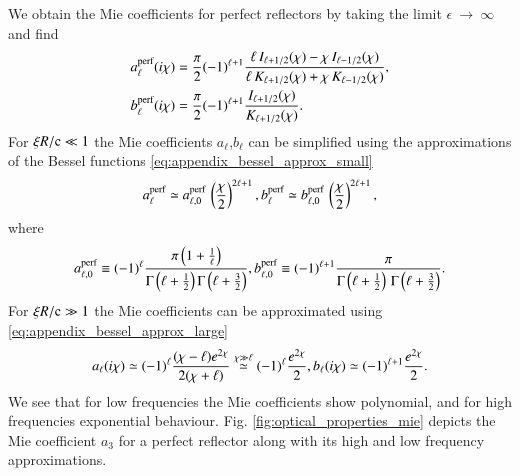 We obtain the Mie coefficients for perfect reflectors by taking the limit
$\epsilon~\to~\infty$ and find
\begin{align}
a_\ell^\text{perf}(i\chi) &= \frac{\pi}{2} (-1)^{\ell+1} \frac{ \ell\,I_{\ell+1/2}(\chi) - \chi\,I_{\ell-1/2}(\chi) }{ \ell\,K_{\ell+1/2}(\chi) + \chi\,K_{\ell-1/2}(\chi) }, \\
b_\ell^\text{perf}(i\chi) &= \frac{\pi}{2} (-1)^{\ell+1} \frac{ I_{\ell+1/2}(\chi)}{ K_{\ell+1/2}(\chi) }.
\end{align}
For $\xi R/\mathrm{c} \ll 1$ the Mie coefficients $a_\ell$,$b_\ell$ can be simplified
using the approximations of the Bessel functions \eqref{eq:appendix_bessel_approx_small}
\begin{equation}
\label{eq:scattering_ps_mie_approx}
a_\ell^\text{perf} \simeq a_{\ell,0}^\text{perf} \, \left(\frac{\chi}{2}\right)^{2\ell+1}, \\
b_\ell^\text{perf} \simeq b_{\ell,0}^\text{perf} \, \left(\frac{\chi}{2}\right)^{2\ell+1},
\end{equation}
where
\begin{equation}
\label{eq:scattering_ps_mie_prefactors}
a_{\ell,0}^\text{perf} \equiv (-1)^{\ell}   \frac{\pi\left( 1 + \frac{1}{\ell}\right)}{\Gamma\left(\ell+\frac{1}{2}\right) \Gamma\left(\ell+\frac{3}{2}\right)}, \\
b_{\ell,0}^\text{perf} \equiv (-1)^{\ell+1} \frac{\pi}{\Gamma\left(\ell+\frac{1}{2}\right)\,\Gamma\left(\ell+\frac{3}{2}\right)}.
\end{equation}
For $\xi R / \mathrm{c} \gg 1$ the Mie coefficients can be approximated
using \eqref{eq:appendix_bessel_approx_large}
\begin{equation}
\label{eq:optical_properties_mie_large}
a_\ell(i\chi) \simeq (-1)^\ell \frac{(\chi-\ell)e^{2\chi}}{2(\chi+\ell)} \overset{\chi\gg\ell}{\simeq} (-1)^\ell \frac{e^{2\chi}}{2}, \\
b_\ell(i\chi) \simeq (-1)^{\ell+1} \frac{e^{2\chi}}{2}.
\end{equation}
We see that for low frequencies the Mie coefficients show polynomial, and for
high frequencies exponential behaviour. Fig. \ref{fig:optical_properties_mie}
depicts the Mie coefficient $a_3$ for a perfect reflector along with its high
and low frequency approximations.
